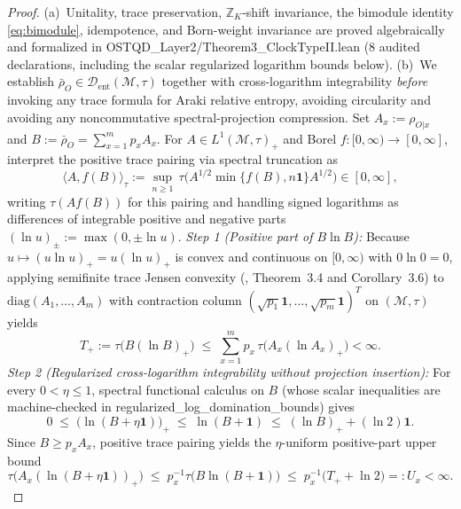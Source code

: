 \documentclass[11pt,a4paper]{article}
\theoremstyle{definition}
\theoremstyle{remark}
\newcommand{\cD}{\mathcal{D}}
\newcommand{\cM}{\mathcal{M}}
\newcommand{\bbZ}{\mathbb{Z}}
\newcommand{\1}{\mathbf{1}}
\newcommand{\code}[1]{{\scriptsize\ttfamily #1}}
\begin{document}
\begin{proof}
(a)~Unitality, trace preservation, $\bbZ_K$-shift invariance, the bimodule identity \eqref{eq:bimodule}, idempotence, and Born-weight invariance are proved algebraically and formalized in \code{OSTQD\_Layer2/\allowbreak Theorem3\_\allowbreak ClockTypeII.lean} (8 audited declarations, including the scalar regularized logarithm bounds below).
(b)~We establish $\bar{\rho}_O\in\cD_{\mathrm{ent}}(\cM,\tau)$ together with cross-logarithm integrability \emph{before} invoking any trace formula for Araki relative entropy, avoiding circularity and avoiding any noncommutative spectral-projection compression. Set $A_x:=\rho_{O|x}$ and $B:=\bar{\rho}_O=\sum_{x=1}^m p_x A_x$. For $A\in L^1(\cM,\tau)_+$ and Borel $f:[0,\infty)\to[0,\infty]$, interpret the positive trace pairing via spectral truncation as
\begin{equation*}
  \langle A, f(B)\rangle_\tau := \sup_{n\ge 1}\,\tau\bigl(A^{1/2}\min\{f(B),n\1\}A^{1/2}\bigr) \in [0,\infty],
\end{equation*}
writing $\tau(A f(B))$ for this pairing and handling signed logarithms as differences of integrable positive and negative parts $(\ln u)_\pm := \max(0,\pm\ln u)$.
\emph{Step 1 (Positive part of $B\ln B$):} Because $u\mapsto (u\ln u)_+=u(\ln u)_+$ is convex and continuous on $[0,\infty)$ with $0\ln 0=0$, applying semifinite trace Jensen convexity (\cite{HaradaKosaki2010}, Theorem~3.4 and Corollary~3.6) to $\mathrm{diag}(A_1,\dots,A_m)$ with contraction column $(\sqrt{p_1}\1,\dots,\sqrt{p_m}\1)^T$ on $(\cM,\tau)$ yields
\begin{equation*}
  T_+ := \tau\bigl(B(\ln B)_+\bigr)
  \;\le\; \sum_{x=1}^m p_x\,\tau\bigl(A_x(\ln A_x)_+\bigr) < \infty.
\end{equation*}
\emph{Step 2 (Regularized cross-logarithm integrability without projection insertion):} For every $0<\eta\le 1$, spectral functional calculus on $B$ (whose scalar inequalities are machine-checked in \code{regularized\_\allowbreak log\_\allowbreak domination\_\allowbreak bounds}) gives
\begin{equation*}
  0 \;\le\; \bigl(\ln(B+\eta\1)\bigr)_+ \;\le\; \ln(B+\1) \;\le\; (\ln B)_+ + (\ln 2)\1.
\end{equation*}
Since $B\ge p_x A_x$, positive trace pairing yields the $\eta$-uniform positive-part upper bound
\begin{equation*}
  \tau\bigl(A_x(\ln(B+\eta\1))_+\bigr)
  \;\le\; p_x^{-1}\tau\bigl(B\ln(B+\1)\bigr)
  \;\le\; p_x^{-1}\bigl(T_+ + \ln 2\bigr) =: U_x < \infty.

\end{equation*}
\end{proof}
\end{document}
